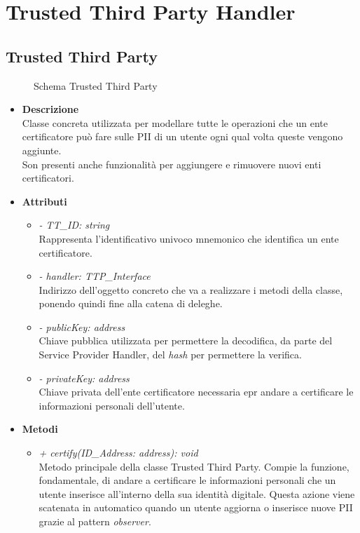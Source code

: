 \section{Trusted Third Party Handler}
\subsection{Trusted Third Party}
\begin{figure}[!h]
	\centering
	\caption{Schema Trusted Third Party}
\end{figure}
\begin{itemize}
	\item \textbf{Descrizione}\\
	Classe concreta utilizzata per modellare tutte le operazioni che un ente certificatore può fare sulle \gls{PII} di un utente ogni qual volta queste vengono aggiunte.\\
	Son presenti anche funzionalità per aggiungere e rimuovere nuovi enti certificatori.
	\item \textbf{Attributi}
	\begin{itemize}
		\item \textit{- TT\_ID: string}\\
		Rappresenta l'identificativo univoco mnemonico che identifica un ente certificatore.
		\item \textit{- handler: TTP\_Interface}\\
		Indirizzo dell'oggetto concreto che va a realizzare i metodi della classe, ponendo quindi fine alla catena di deleghe.
		\item \textit{- publicKey: address}\\
		Chiave pubblica utilizzata per permettere la decodifica, da parte del Service Provider Handler, del \textit{hash} per permettere la verifica.
		\item \textit{- privateKey: address}\\
		Chiave privata dell'ente certificatore necessaria epr andare a certificare le informazioni personali dell'utente.
	\end{itemize}
	\item \textbf{Metodi}
	\begin{itemize}
		\item \textit{+ certify(ID\_Address: address): void}\\
		Metodo principale della classe Trusted Third Party. Compie la funzione, fondamentale, di andare a certificare le informazioni personali che un utente inserisce all'interno della sua identità digitale. Questa azione viene scatenata in automatico quando un utente aggiorna o inserisce nuove \gls{PII} grazie al pattern \textit{observer}.\\\\

\end{itemize}
\end{itemize}
